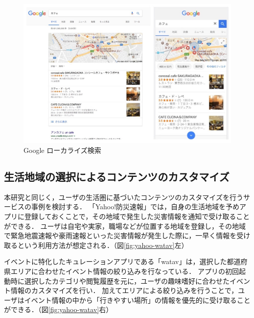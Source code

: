 \documentclass[a4paper]{jsarticle}
\begin{document}
\fifigure
\begin{figure}[H]
  \begin{center}
    \includegraphics[width=0.85\hsize]{./images/localize_search.jpg}
    \caption{Google ローカライズ検索}
    \label{fig:localize-search}
  \end{center}
\end{figure}
\fi

\subsection{生活地域の選択によるコンテンツのカスタマイズ}
本研究と同じく，ユーザの生活圏に基づいたコンテンツのカスタマイズを行うサービスの事例を検討する．
「Yahoo!防災速報\cite{yahoo}」では，自身の生活地域を予めアプリに登録しておくことで，その地域で発生した災害情報を通知で受け取ることができる．
ユーザは自宅や実家，職場などが位置する地域を登録し，その地域で緊急地震速報や豪雨速報といった災害情報が発生した際に，一早く情報を受け取るという利用方法が想定される．（図\ref{fig:yahoo-watav}左）


イベントに特化したキュレーションアプリである「watav\cite{watav}」は，選択した都道府県エリアに合わせたイベント情報の絞り込みを行なっている．
アプリの初回起動時に選択したカテゴリや閲覧履歴を元に，ユーザの趣味嗜好に合わせたイベント情報のカスタマイズを行い．
加えてエリアによる絞り込みを行うことで，ユーザはイベント情報の中から「行きやすい場所」の情報を優先的に受け取ることができる．（図\ref{fig:yahoo-watav}右）
\end{document}
